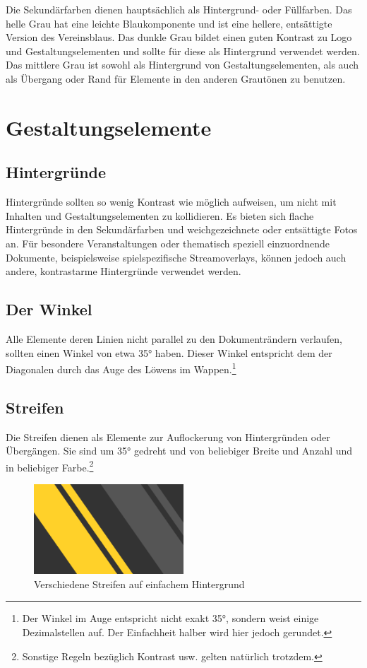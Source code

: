 \documentclass{article}
\begin{document}
Die Sekundärfarben dienen hauptsächlich als Hintergrund- oder Füllfarben.
Das helle Grau hat eine leichte Blaukomponente und ist eine hellere, entsättigte Version des Vereinsblaus.
Das dunkle Grau bildet einen guten Kontrast zu Logo und Gestaltungselementen und sollte für diese als Hintergrund verwendet werden.
Das mittlere Grau ist sowohl als Hintergrund von Gestaltungselementen, als auch als Übergang oder Rand für Elemente in den anderen Grautönen zu benutzen.

\cleardoublepage
\section{Gestaltungselemente}

\subsection{Hintergründe}
Hintergründe sollten so wenig Kontrast wie möglich aufweisen, um nicht mit Inhalten und Gestaltungselementen zu kollidieren.
Es bieten sich flache Hintergründe in den Sekundärfarben und weichgezeichnete oder entsättigte Fotos an.
Für besondere Veranstaltungen oder thematisch speziell einzuordnende Dokumente, beispielsweise spielspezifische Streamoverlays, können jedoch auch andere, kontrastarme Hintergründe verwendet werden.


\subsection{Der Winkel}
Alle Elemente deren Linien nicht parallel zu den Dokumenträndern verlaufen, sollten einen Winkel von etwa 35° haben.
Dieser Winkel entspricht dem der Diagonalen durch das Auge des Löwens im Wappen.\footnote{Der Winkel im Auge entspricht nicht exakt 35°, sondern weist einige Dezimalstellen auf. Der Einfachheit halber wird hier jedoch gerundet.}


\subsection{Streifen}
Die Streifen dienen als Elemente zur Auflockerung von Hintergründen oder Übergängen.
Sie sind um 35° gedreht und von beliebiger Breite und Anzahl und in beliebiger Farbe.\footnote{Sonstige Regeln bezüglich Kontrast usw. gelten natürlich trotzdem.}

\begin{figure}[H]
\begin{center}
\includegraphics[width=0.5\textwidth]{Docs/streifen_beispiel.png}
\end{center}
\caption{Verschiedene Streifen auf einfachem Hintergrund}
\end{figure}
\end{document}
